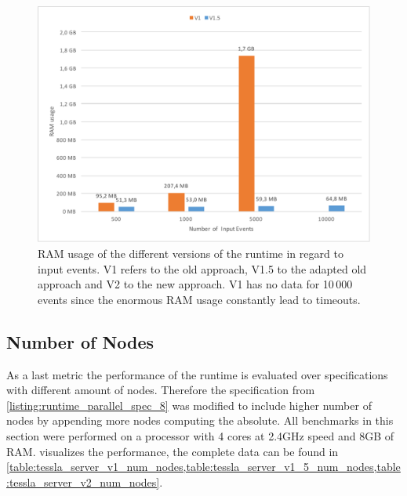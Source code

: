 \begin{figure}
  \includegraphics[angle=90,origin=c,width=\textwidth]{gfx/runtime_ram_usage_benchmark}
  \caption[RAM usage of the different versions of the runtime]{RAM usage of the different versions of the runtime in regard to input events. V1 refers to the old approach, V1.5 to the adapted old approach and V2 to the new approach. V1 has no data for 10\,000 events since the enormous RAM usage constantly lead to timeouts.}
\label{fig:chap_eval:runtime_ram_usage}
\end{figure}

\subsection{Number of Nodes}

As a last metric the performance of the runtime is evaluated over specifications with different amount of nodes.
Therefore the specification from \cref{listing:runtime_parallel_spec_8} was modified to include higher number of nodes by appending more nodes computing the absolute.
All benchmarks in this section were performed on a processor with 4 cores at 2.4GHz speed and 8GB of RAM.
 visualizes the performance, the complete data can be found in \cref{table:tessla_server_v1_num_nodes,table:tessla_server_v1_5_num_nodes,table:tessla_server_v2_num_nodes}.

